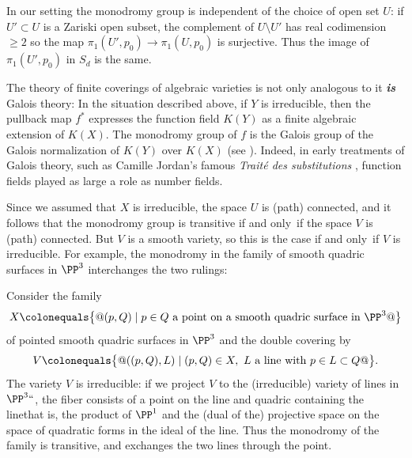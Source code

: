 \begin{fact}\label{Galois equals monodromy}
In our setting  the monodromy group is independent of the choice of open
set $U$: if $U' \subset U$ is a Zariski open subset, the complement of
$U\setminus U'$ has
real codimension $\geq 2$ so the map $\pi_1(U', p_0) \to \pi_1(U,p_0)$
is surjective. Thus the image of $\pi_1(U', p_0)$ in $S_d$ is the same.

The theory of finite coverings of algebraic varieties is not only
analogous to 
it \emph{\bfseries{is}} Galois theory: In the situation
described above, if $Y$ is irreducible, then the pullback map $f^*$
expresses the function field $K(Y)$ as a finite algebraic extension of
$K(X)$. The monodromy group of $f$  is the Galois group of the Galois
%
normalization of $K(Y)$ over $K(X)$ (see \cite{Harris1979}). Indeed,
in early treatments of Galois theory, such as 
Camille Jordan's
famous \emph{Trait\'e
%
des substitutions} \citeyear{MR1188877}, 
function fields played as large a role as number fields.
%
%
\end{fact}

Since we assumed that $X$ is irreducible, the space $U$ is (path)
connected, and it follows that the monodromy group is transitive if and
%
only~if the space $V$ is (path) connected. But $V$ is a smooth
variety, so this is the case if and only~if $V$ is irreducible. For
example, the monodromy in the family
of 
smooth quadric surfaces in $\PP^3$
interchanges the two 
rulings:
%
%

\begin{example}\label{monodromy of rulings}
Consider the family
$$
X \colonequals  \big\{@(p,Q) \mid p\in Q\hbox{ a point on a smooth quadric
surface in $\PP^3$}@\big\}
$$
of pointed smooth quadric surfaces in $\PP^3$ and the double covering by
$$
V\colonequals  \big\{@((p,Q), L)\mid (p,Q)\in X,\ L \hbox{ a line with $p
\in L\subset Q$}@\big\}.
$$
The variety $V$ is irreducible: if we project $V$ to the (irreducible)
variety of lines in $\PP^3` `$,
the fiber consists of a point on the line and quadric containing the
line\emdash that is, the product
of $\PP^1$ and the (dual of the) projective space
on the space of quadratic forms in the ideal of the line. Thus the
monodromy of the family
is transitive, and exchanges the two lines through the point.
\end{example}

